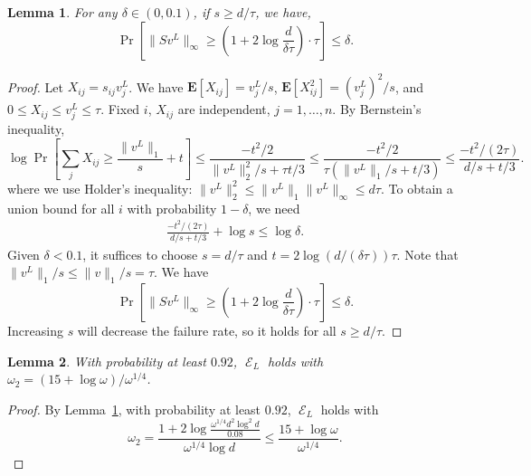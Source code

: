 \documentclass[11pt]{article}
\newtheorem{lemma}{Lemma}
\DeclareMathOperator{\E}{\mathcal{E}}
\begin{document}
\begin{lemma}
  \label{lemma:E_L}
  For any $\delta \in (0, 0.1)$, if $s \geq d/\tau$, we have,
  \begin{equation*}
    \Pr \left[ \|S v^L \|_\infty 
      \geq \left( 1 + 2 \log \frac{d}{\delta \tau} \right) \cdot \tau \right] \leq \delta.
  \end{equation*}
\end{lemma}
\begin{proof}
  Let $X_{ij} = s_{ij} v^L_j$.
  We have $\mathbf{E}[X_{ij}] = v^L_j/s$, $\mathbf{E}[X_{ij}^2] = (v^L_j)^2/s$,
  and $0 \leq X_{ij} \leq v^L_j \leq \tau$.
  Fixed $i$, $X_{ij}$ are independent, $j=1,\ldots,n$.
  By Bernstein's inequality,
  \begin{equation*}
    \log \Pr\left[\sum_j X_{ij} 
      \geq \frac{\|v^L\|_1}{s} + t\right] \leq \frac{-t^2/2}{\|v^L\|_2^2 /s + \tau t / 3 } 
    \leq \frac{-t^2/2}{\tau ( \|v^L\|_1 / s + t / 3)} \leq \frac{- t^2/(2 \tau)}{d/s + t/3}.
  \end{equation*}
  where we use Holder's inequality: $\|v^L\|_2^2 \leq \|v^L\|_1 \|v^L\|_\infty
  \leq d \tau$.
  To obtain a union bound for all $i$ with probability $1-\delta$, we need
  \begin{align*}
    \frac{-t^2/(2 \tau)}{d/s + t/3} + \log s \leq \log \delta.
  \end{align*}
  Given $\delta < 0.1$, it suffices to choose $s = d/\tau$ and $t = 2
  \log(d/(\delta \tau)) \tau$.
  Note that $\|v^L\|_1/s \leq \|v\|_1/s = \tau$.
  We have
  \begin{equation*}
    \Pr \left[\|S v^L\|_\infty 
      \geq \left( 1 + 2 \log \frac{d}{\delta \tau} \right)\cdot \tau \right] \leq \delta.
  \end{equation*}
  Increasing $s$ will decrease the failure rate, so it holds for all $s \geq
  d/\tau$.
\end{proof}

\begin{lemma}
  With probability at least $0.92$, $\E_L$ holds with $\omega_2 = (15 +
  \log \omega)/\omega^{1/4}$.
\end{lemma}
\begin{proof}
  By Lemma~\ref{lemma:E_L}, with probability at least $0.92$, $\E_L$
  holds with
  \begin{equation*}
    \omega_2 = \frac{1+2\log \frac{\omega^{1/4} d^2 \log^2 d}{0.08}}{\omega^{1/4} \log d} 
    \leq \frac{15 + \log \omega}{\omega^{1/4}}.
  \end{equation*}
\end{proof}
\end{document}
